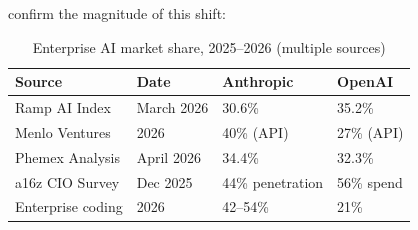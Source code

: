 \documentclass[11pt]{article}
\theoremstyle{definition}
\begin{document}
confirm the magnitude of this shift:











\begin{table}[h]





\centering





\caption{Enterprise AI market share, 2025--2026 (multiple sources)}





\begin{tabular}{llll}





\toprule





\textbf{Source} & \textbf{Date} & \textbf{Anthropic} & \textbf{OpenAI} \\





\midrule





Ramp AI Index & March 2026 & 30.6\% & 35.2\% \\





Menlo Ventures & 2026 & 40\% (API) & 27\% (API) \\





Phemex Analysis & April 2026 & 34.4\% & 32.3\% \\





a16z CIO Survey & Dec 2025 & 44\% penetration & 56\% spend \\





Enterprise coding & 2026 & 42--54\% & 21\% \\





\bottomrule





\end{tabular}





\end{table}
\end{document}
